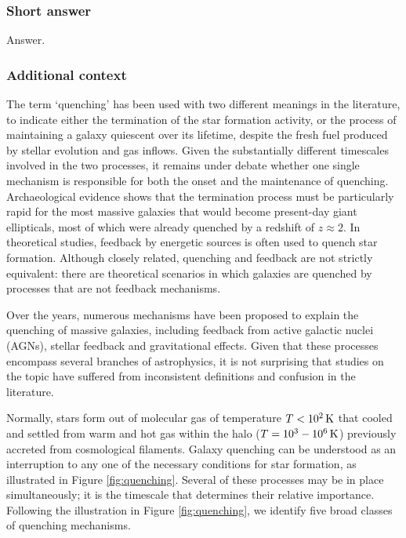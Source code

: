 \documentclass[a4paper,11pt]{article}
\begin{document}
\subsubsection{Short answer}

Answer.

\subsubsection{Additional context}

The term `quenching' has been used with two different meanings in the literature, to indicate either the termination of the star formation activity, or the process of maintaining a galaxy quiescent over its lifetime, despite the fresh fuel produced by stellar evolution and gas inflows. Given the substantially different timescales involved in the two processes, it remains under debate whether one single mechanism is responsible for both the onset and the maintenance of quenching. Archaeological evidence shows that the termination process must be particularly rapid for the most massive galaxies that would become present-day giant ellipticals, most of which were already quenched by a redshift of $z\approx2$. In theoretical studies, feedback by energetic sources is often used to quench star formation. Although closely related, quenching and feedback are not strictly equivalent: there are theoretical scenarios in which galaxies are quenched by processes that are not feedback mechanisms.

{\noindent}Over the years, numerous mechanisms have been proposed to explain the quenching of massive galaxies, including feedback from active galactic nuclei (AGNs), stellar feedback and gravitational effects. Given that these processes encompass several branches of astrophysics, it is not surprising that studies on the topic have suffered from inconsistent definitions and confusion in the literature.

{\noindent}Normally, stars form out of molecular gas of temperature $T<10^2\,{\rm K}$ that cooled and settled from warm and hot gas within the halo ($T=10^3-10^6\,{\rm K}$) previously accreted from cosmological filaments. Galaxy quenching can be understood as an interruption to any one of the necessary conditions for star formation, as illustrated in Figure \ref{fig:quenching}. Several of these processes may be in place simultaneously; it is the timescale that determines their relative importance. Following the illustration in Figure \ref{fig:quenching}, we identify five broad classes of quenching mechanisms.
\end{document}
